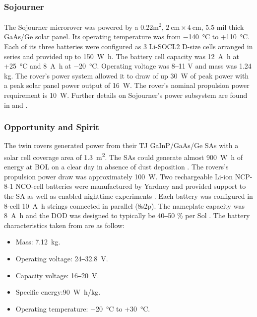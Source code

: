 \subsubsection{Sojourner}
The Sojourner microrover was powered by a 0.22\si{\meter\squared}, $\SI{2}{\centi\meter}\times\SI{4}{\centi\meter}$, 5.5 mil thick \ac{GaAs}/\ac{Ge} solar panel. Its operating temperature was from \SI{-140}{\celsius} to +\SI{110}{\celsius}. Each of its three batteries were configured as 3 \ac{Li-SOCL2} D-size cells arranged in series and provided up to \SI{150}{\watt\hour}. The battery cell capacity was \SI{12}{\ampere\hour} at +\SI{25}{\celsius} and \SI{8}{\ampere\hour} at \SI{-20}{\celsius}. Operating voltage was 8‒11 \si{\volt} and mass was 1.24 \si{\kilo\gram}. The rover's power system allowed it to draw of up \SI{30}{\watt} of peak power with a peak solar panel power output of \SI{16}{\watt}. The rover's nominal propulsion power requirement is \SI{10}{\watt}. Further details on Sojourner's power subsystem are found in  and .

\subsubsection{Opportunity and Spirit}
The twin rovers generated power from their \ac{TJ} \ac{GaInP}/\ac{GaAs}/\ac{Ge} \acp{SA} with a solar cell coverage area of \SI{1.3}{\square\meter}. The \acp{SA} could generate almost \SI{900}{\watt\hour} of energy at \ac{BOL} on a clear day in absence of dust deposition . The rovers's propulsion power draw was approximately \SI{100}{\watt}. Two rechargeable \ac{Li-ion} NCP-8-1 \ac{NCO}-cell batteries were manufactured by Yardney and provided support to the \ac{SA} as well as enabled nighttime experiments . Each battery was configured in 8-cell \SI{10}{\ampere\hour} strings connected in parallel (8s2p). The nameplate capacity was \SI{8}{\ampere\hour} and the \ac{DOD} was designed to typically be 40‒50 \si{\percent} per Sol . The battery characteristics taken from  are as follow:

\begin{itemize}
	\item Mass: \SI{7.12}{\kilo\gram}.
	\item Operating voltage: 24‒\SI{32.8}{\volt}.
	\item Capacity voltage: 16‒\SI{20}{\volt}.
	\item Specific energy:\SI{90}{\watt\hour/\kilo\gram}.
    \item Operating temperature: \SI{-20}{\celsius} to +\SI{30}{\celsius}.
\end{itemize}


